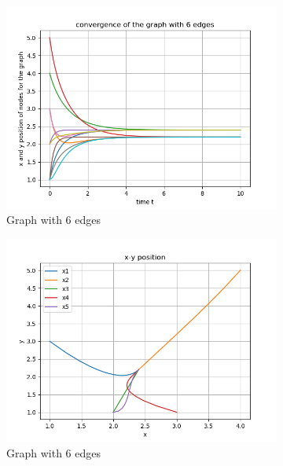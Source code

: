 \documentclass{article}
\begin{document}
\begin{problem}
    \begin{figure}
        \centering   
        \begin{subfigure}{0.4\textwidth}
            \includegraphics[width=\textwidth]{./img/p3_edge_6_1.png}
            \caption{Graph with 6 edges}
        \end{subfigure}
        \begin{subfigure}{0.4\textwidth}
            \includegraphics[width=\textwidth]{./img/p3_edge_6_2.png}
            \caption{Graph with 6 edges}
        \end{subfigure}
        \begin{subfigure}{0.4\textwidth}

\end{subfigure}
\end{figure}
\end{problem}
\end{document}

